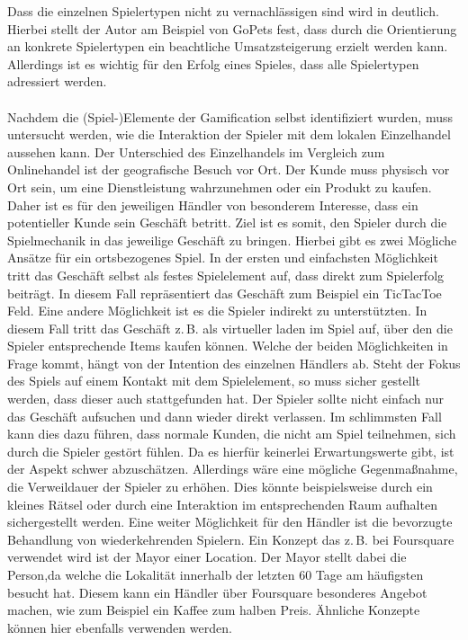 Dass die einzelnen Spielertypen nicht zu vernachlässigen sind wird in \textcite{Bromley.2013} deutlich. Hierbei stellt der Autor am Beispiel von GoPets fest, dass durch die Orientierung an konkrete Spielertypen ein beachtliche Umsatzsteigerung erzielt werden kann. Allerdings ist es wichtig für den Erfolg eines Spieles, dass alle Spielertypen adressiert werden.\cite{Bethke.2007}
\\\\
Nachdem die (Spiel-)Elemente der Gamification selbst identifiziert wurden, muss untersucht werden, wie die Interaktion der Spieler mit dem lokalen Einzelhandel aussehen kann.
Der Unterschied des Einzelhandels im Vergleich zum Onlinehandel ist der geografische Besuch vor Ort. Der Kunde muss physisch vor Ort sein, um eine Dienstleistung wahrzunehmen oder ein Produkt zu kaufen. Daher ist es für den jeweiligen Händler von besonderem Interesse, dass ein potentieller Kunde sein Geschäft betritt.
Ziel ist es somit, den Spieler durch die Spielmechanik in das jeweilige Geschäft zu bringen.
Hierbei gibt es zwei Mögliche Ansätze für ein ortsbezogenes Spiel. In der ersten und einfachsten Möglichkeit tritt das Geschäft selbst als festes Spielelement auf, dass direkt zum Spielerfolg beiträgt. In diesem Fall repräsentiert das Geschäft zum Beispiel ein TicTacToe Feld. Eine andere Möglichkeit ist es die Spieler indirekt zu unterstützten. In diesem Fall tritt das Geschäft z.\,B. als virtueller laden im Spiel auf, über den die Spieler entsprechende Items kaufen können.
Welche der beiden Möglichkeiten in Frage kommt, hängt von der Intention des einzelnen Händlers ab. Steht der Fokus des Spiels auf einem Kontakt mit dem Spielelement, so 
muss sicher gestellt werden, dass dieser auch stattgefunden hat. Der Spieler sollte nicht einfach nur das Geschäft aufsuchen und dann wieder direkt verlassen. Im schlimmsten Fall kann dies dazu führen, dass normale Kunden, die nicht am Spiel teilnehmen, sich durch die Spieler gestört fühlen.
Da es hierfür keinerlei Erwartungswerte gibt, ist der Aspekt schwer abzuschätzen. Allerdings wäre eine mögliche Gegenmaßnahme, die Verweildauer der Spieler zu erhöhen. Dies könnte beispielsweise durch  ein kleines Rätsel oder durch eine Interaktion im entsprechenden Raum aufhalten sichergestellt werden.
Eine weiter Möglichkeit für den Händler ist die bevorzugte Behandlung von wiederkehrenden Spielern. Ein Konzept das z.\,B. bei Foursquare verwendet wird ist der Mayor einer Location. Der Mayor stellt dabei die Person,da welche die Lokalität innerhalb der letzten 60 Tage am häufigsten besucht hat. Diesem kann ein Händler über Foursquare besonderes Angebot machen, wie zum Beispiel ein Kaffee zum halben Preis.\cite{Lindqvist.2011} Ähnliche Konzepte können hier ebenfalls verwenden werden.
